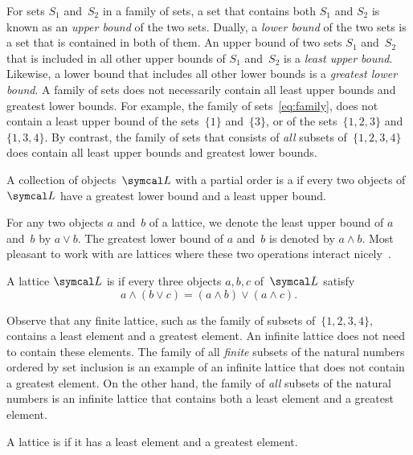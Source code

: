 For sets $S_1$ and~$S_2$ in a family of sets, a set that contains both $S_1$ and $S_2$ is known as an \emph{upper bound} of the two sets.
Dually, a \emph{lower bound} of the two sets is a set that is contained in both of them.
An upper bound of two sets $S_1$ and~$S_2$ that is included in all other upper bounds of $S_1$ and~$S_2$ is a \emph{least upper bound}.
Likewise, a lower bound that includes all other lower bounds is a \emph{greatest lower bound}.
A family of sets does not necessarily contain all least upper bounds and greatest lower bounds.
For example, the family of sets~\eqref{eq:family}, does not contain a least upper bound of the sets~$\{1\}$ and~$\{3\}$, or of the sets~$\{1, 2, 3\}$ and~$\{1, 3, 4\}$.
By contrast, the family of sets that consists of \emph{all} subsets of~$\{1, 2, 3, 4\}$ does contain all least upper bounds and greatest lower bounds.
\begin{definition}
  A collection of objects~$\calL$ with a partial order is a  if every two objects of $\calL$ have a greatest lower bound and a least upper bound.
\end{definition}

For any two objects $a$ and~$b$ of a lattice, we denote the least upper bound of $a$ and~$b$ by $a \lor b$.
The greatest lower bound of $a$ and~$b$ is denoted by $a \land b$.
Most pleasant to work with are lattices where these two operations interact nicely~\parencite{davey2002introduction}.
\begin{definition}
  A lattice $\calL$ is  if every three objects $a, b, c$ of~$\calL$ satisfy
  \begin{equation*}
    a \land (b \lor c) = (a \land b) \lor (a \land c).
  \end{equation*}
\end{definition}

Observe that any finite lattice, such as the family of subsets of~$\{1, 2, 3, 4\}$, contains a least element and a greatest element.
An infinite lattice does not need to contain these elements.
The family of all \emph{finite} subsets of the natural numbers ordered by set inclusion is an example of an infinite lattice that does not contain a greatest element.
On the other hand, the family of \emph{all} subsets of the natural numbers is an infinite lattice that contains both a least element and a greatest element.
\begin{definition}
  A lattice is  if it has a least element and a greatest element.
\end{definition}

